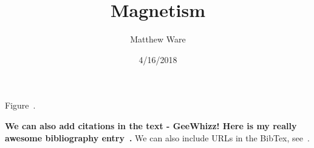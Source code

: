 \documentclass[12pt]{article}
\begin{document}
\title{Magnetism}
\author{Matthew Ware}
\date{4/16/2018}
\maketitle

Figure~.

\lipsum[1-3]

\textbf{We can also add citations in the text - GeeWhizz!
Here is my really awesome bibliography entry~\cite{SampleBibEntry}.}
We can also include URLs in the BibTex, see~\cite{hyperphys_electricField}.

\lipsum[4-6]

\printAllEquations



\end{document}
